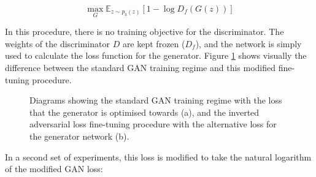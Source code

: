 \begin{equation} 
  \max_{G}\mathbb{E}_{z\sim p_{\text{z}}(z)}[1 - \log{D_{f}(G(z))}]
  \label{eq:inverted-adv-loss}
  \end{equation}

In this procedure, there is no training objective for the discriminator. 
The weights of the discriminator $D$ are kept frozen ($D_{f}$), and the network is simply used to calculate the loss function for the generator.
Figure \ref{fig:c4:gan-diagrams} shows visually the difference between the standard GAN training regime and this modified fine-tuning procedure. 

\begin{figure}[!htbp]
  \centering
  \hfill
  \caption[Adversarial and inverted adversarial loss diagram]{Diagrams showing the standard GAN training regime with the loss that the generator is optimised towards (a), and the inverted adversarial loss fine-tuning procedure with the alternative loss for the generator network (b).}
  \label{fig:c4:gan-diagrams}
\end{figure}

In a second set of experiments, this loss is modified to take the natural logarithm of the modified GAN loss:

